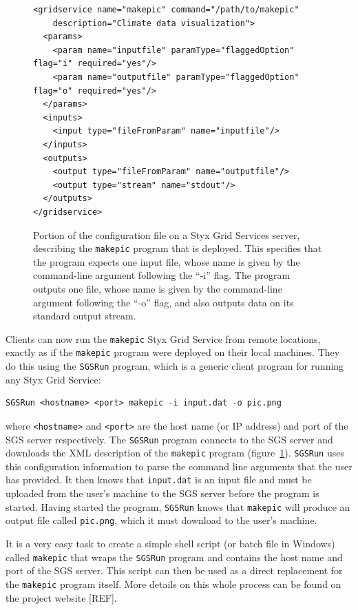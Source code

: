 \documentclass[a4paper]{article}
\begin{document}
\begin{multicols}{2}
\begin{figure}
\centering
\begin{verbatim}
<gridservice name="makepic" command="/path/to/makepic"
    description="Climate data visualization">
  <params>
    <param name="inputfile" paramType="flaggedOption" flag="i" required="yes"/>
    <param name="outputfile" paramType="flaggedOption" flag="o" required="yes"/>
  </params>
  <inputs>
    <input type="fileFromParam" name="inputfile"/>
  </inputs>
  <outputs>
    <output type="fileFromParam" name="outputfile"/>
    <output type="stream" name="stdout"/>
  </outputs>
</gridservice>
\end{verbatim}
\caption{Portion of the configuration file on a Styx Grid Services server, describing the {\tt makepic} program that is deployed.  This specifies that the program expects one input file, whose name is given by the command-line argument following the ``-i'' flag.  The program outputs one file, whose name is given by the command-line argument following the ``-o'' flag, and also outputs data on its standard output stream.}
\label{fig:makepicconfig}
\end{figure}

Clients can now run the {\tt makepic} Styx Grid Service from remote locations, exactly as if the {\tt makepic} program were deployed on their local machines.  They do this using the {\tt SGSRun} program, which is a generic client program for running any Styx Grid Service:

\begin{verbatim}
SGSRun <hostname> <port> makepic -i input.dat -o pic.png
\end{verbatim}
where {\tt <hostname>} and {\tt <port>} are the host name (or IP address) and port of the SGS server respectively.  The {\tt SGSRun} program connects to the SGS server and downloads the XML description of the {\tt makepic} program  (figure~\ref{fig:makepicconfig}).  {\tt SGSRun} uses this configuration information to parse the command line arguments that the user has provided.  It then knows that {\tt input.dat} is an input file and must be uploaded from the user's machine to the SGS server before the program is started.  Having started the program, {\tt SGSRun} knows that {\tt makepic} will produce an output file called {\tt pic.png}, which it must download to the user's machine.

It is a very easy task to create a simple shell script (or batch file in Windows) called {\tt makepic} that wraps the {\tt SGSRun} program and contains the host name and port of the SGS server.  This script can then be used as a direct replacement for the {\tt makepic} program itself.  More details on this whole process can be found on the project website [REF].


\end{multicols}
\end{document}
